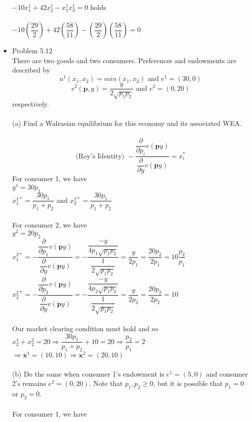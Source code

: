 \documentclass{article}
\begin{document}
\begin{itemize}
    $-10x_1^1+42x_2^1-x_1^1x_2^1=0$ holds\\\\
    $-10(\dfrac{29}{2})+42(\dfrac{58}{11})-(\dfrac{29}{2})(\dfrac{58}{11})=0$
    \pagebreak
    \item Problem 5.12\\
    There are two goods and two consumers.  Preferences and endowments are described by
    $$u^1(x_1,x_2)=min(x_1,x_2)\text{ and }e^1=(30,0)$$
    $$v^2(\textbf{p},y)=\dfrac{y}{2\sqrt{p_1p_2}}\text{ and }e^2=(0,20)$$
    respectively.\\\\
    (a) Find a Walrasian equilibrium for this economy and its associated WEA.\\\\
    $$\text{(Roy's Identity) }-\dfrac{\dfrac{\partial}{\partial p_i}v(\textbf{p}y)}{\dfrac{\partial}{\partial y}v(\textbf{p}y)}=x_i^*$$
    For consumer 1, we have\\
    $y^1=30p_1$\\
    $x_1^{1*}=\dfrac{30p_1}{p_1+p_2}$ and $x_2^{1*}=\dfrac{30p_1}{p_1+p_2}$\\\\
    For consumer 2, we have\\
    $y^2=20p_2$\\
    $x_1^{2*}=-\dfrac{\dfrac{\partial}{\partial p_1}v(\textbf{p}y)}{\dfrac{\partial}{\partial y}v(\textbf{p}y)}=-\dfrac{\dfrac{-y}{4p_1\sqrt{p_1p_2}}}{\dfrac{1}{2\sqrt{p_1p_2}}}=\dfrac{y}{2p_1}=\dfrac{20p_2}{2p_1}=10\dfrac{p_2}{p_1}$\\
    $x_2^{2*}=-\dfrac{\dfrac{\partial}{\partial p_2}v(\textbf{p}y)}{\dfrac{\partial}{\partial y}v(\textbf{p}y)}=-\dfrac{\dfrac{-y}{4p_2\sqrt{p_1p_2}}}{\dfrac{1}{2\sqrt{p_1p_2}}}=\dfrac{y}{2p_2}=\dfrac{20p_2}{2p_2}=10$\\\\
    Our market clearing condition must hold and so\\
    $x_2^1+x_2^2=20\Rightarrow \dfrac{30p_1}{p_1+p_2}+10=20\Rightarrow\dfrac{p_2}{p_1}=2$\\
    $\Rightarrow\textbf{x}^1=(10,10)\Rightarrow\textbf{x}^2=(20,10)$\\\\
    (b) Do the same when consumer 1's endowment is $e^1=(5,0)$ and consumer 2's remains $e^2=(0,20)$.  Note that $p_1,p_2\geq0$, but it is possible that $p_1=0$ or $p_2=0$.\\\\
    For consumer 1, we have\\

\end{itemize}
\end{document}
